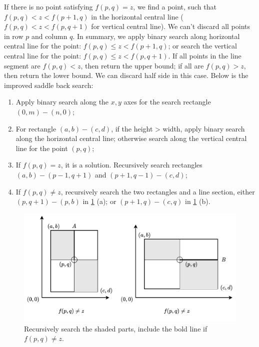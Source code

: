 \documentclass[b5paper]{article}
\begin{document}
If there is no point satisfying $f(p, q) = z$, we find a point, such that $f(p, q) < z < f(p + 1, q)$ in the horizontal central line ($f(p, q) < z < f(p, q + 1)$ for vertical central line). We can't discard all points in row $p$ and column $q$. In summary, we apply binary search along horizontal central line for the point: $f(p, q) \leq z < f(p + 1, q)$; or search the vertical central line for the point: $f(p, q) \leq z < f(p, q + 1)$. If all points in the line segment are $f(p, q) < z$, then return the upper bound; if all are $f(p, q) > z$, then return the lower bound. We can discard half side in this case. Below is the improved saddle back search:

\begin{enumerate}
\item Apply binary search along the $x, y$ axes for the search rectangle $(0, m) - (n, 0)$;
\item For rectangle $(a, b) - (c, d)$, if the height > width, apply binary search along the horizontal central line; otherwise search along the vertical central line for the point $(p, q)$;
\item If $f(p, q) = z$, it is a solution. Recursively search rectangles $(a, b) - (p-1, q+1)$ and $(p+1, q-1) - (c, d)$;
\item If $f(p, q) \neq z$, recursively search the two rectangles and  a line section, either $(p, q+1) - (p, b)$ in \cref{fig:include-line} (a); or $(p+1, q) - (c, q)$ in \cref{fig:include-line} (b).
\end{enumerate}

\begin{figure}[htbp]
 \centering
 \includegraphics[scale=0.6]{img/saddleback-mid-line-inc}
 \caption{Recursively search the shaded parts, include the bold line  if $f(p, q) \neq z$.}
 \label{fig:include-line}
\end{figure}
\end{document}

